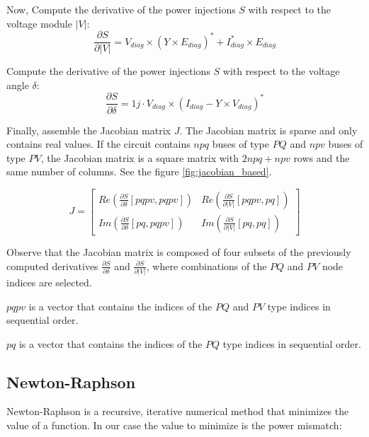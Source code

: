 \documentclass[nols,a4paper,twoside,notoc,fleqn]{tufte-book}
\begin{document}
Now, Compute the derivative of the power injections $S$ with respect to the voltage module $|V|$:
\begin{equation}
\frac{\partial S}{\partial |V|} = V_{diag} \times (Y \times E_{diag})^* + I_{diag}^* \times  E_{diag}
\end{equation}
    
Compute the derivative of the power injections $S$ with respect to the voltage angle $\delta$:
\begin{equation}
\frac{\partial S}{\partial \delta} = 1j \cdot V_{diag} \times (I_{diag} - Y \times V_{diag})^*
\end{equation}

Finally, assemble the Jacobian matrix $J$. The Jacobian matrix is sparse and only contains real values. If the circuit contains $npq$ buses of type $PQ$ and $npv$ buses of type $PV$, the Jacobian matrix is a square matrix with $2 npq + npv$ rows and the same number of columns. See the figure \ref{fig:jacobian_based}.

\begin{equation}
J=
\left[
\begin{array}{cc}
Re\left(\frac{\partial S}{\partial \delta}[pqpv, pqpv]\right) &
Re\left(\frac{\partial S}{\partial |V|}[pqpv, pq]\right) \\
Im\left(\frac{\partial S}{\partial \delta}[pq, pqpv]\right) &
Im\left(\frac{\partial S}{\partial |V|}[pq, pq]\right)
\end{array}
\right]
\end{equation}

Observe that the Jacobian matrix is composed of four subsets of the previously computed derivatives $\frac{\partial S}{\partial \delta}$ and $\frac{\partial S}{\partial |V|}$, where combinations of the $PQ$ and $PV$ node indices are selected.

$pqpv$ is a vector that contains the indices of the $PQ$ and $PV$ type indices in sequential order.

$pq$ is a vector that contains the indices of the $PQ$  type indices in sequential order.

\newpage
\subsection{Newton-Raphson}

Newton-Raphson is a recursive, iterative numerical method that minimizes the value of a function. In our case the value to minimize is the power mismatch:
\end{document}
